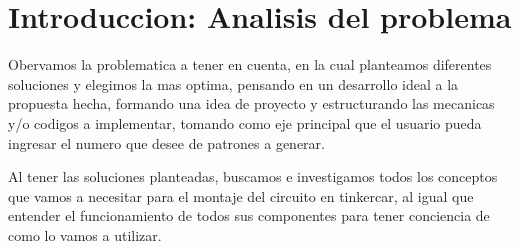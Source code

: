 \documentclass{article}
\begin{document}

\tableofcontents

\vspace{13cm}

\section{Introduccion: Analisis del problema}
Obervamos la problematica a tener en cuenta, en la cual planteamos diferentes soluciones y elegimos la mas optima, pensando en un desarrollo ideal a la propuesta hecha, formando una idea de proyecto y estructurando las mecanicas y/o codigos a implementar, tomando como eje principal que el usuario pueda ingresar el numero que desee de patrones a generar.
 \vspace{1cm}

Al tener las soluciones planteadas, buscamos e investigamos todos los conceptos que vamos a necesitar para el montaje del circuito en tinkercar, al igual que entender el funcionamiento de todos sus componentes para tener conciencia de como lo vamos a utilizar.
\end{document}
